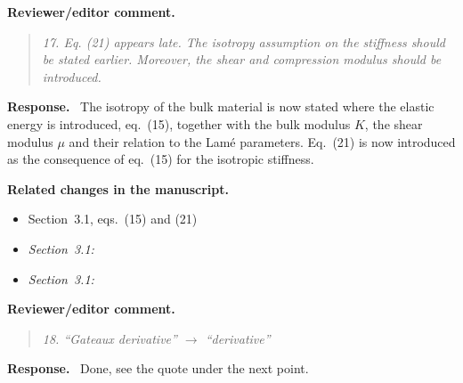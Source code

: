 \documentclass[pdflatex,sn-mathphys-num]{sn-jnl}
\newenvironment{reviewercomment}
  {\par\noindent\textbf{Reviewer/editor comment.}\begin{quote}\itshape}
  {\end{quote}}
\newenvironment{response}
  {\par\noindent\textbf{Response.}\ }
  {\par}
\newenvironment{relatedchanges}
  {\par\noindent\textbf{Related changes in the manuscript.}\begin{itemize}\small}
  {\end{itemize}}
\newcommand{\msloc}[1]{\textit{#1:}\ }
\newcommand{\relhead}[1]{\item[]\vspace*{0.2\baselineskip}#1}
\begin{document}
\begin{reviewercomment}
17. Eq. (21) appears late. The isotropy assumption on the stiffness should be stated earlier. Moreover, the shear and
compression modulus should be introduced.
\end{reviewercomment}
\begin{response}
The isotropy of the bulk material is now stated where the elastic energy is introduced, eq.~(15), together with the bulk modulus $K$, the shear modulus $\mu$ and their relation to the Lam\'e parameters. Eq.~(21) is now introduced as the consequence of eq.~(15) for the isotropic stiffness.
\end{response}
\begin{relatedchanges}
\relhead{Section~3.1, eqs.~(15) and (21)}
\item \msloc{Section~3.1}
\item \msloc{Section~3.1}
\end{relatedchanges}

\begin{reviewercomment}
18. ``Gateaux derivative'' $\to$ ``derivative''
\end{reviewercomment}
\begin{response}
Done, see the quote under the next point.
\end{response}
\end{document}
